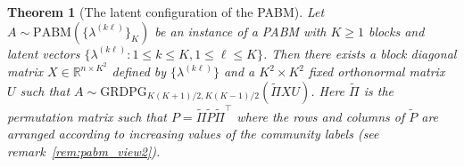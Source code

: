 \documentclass[
  11pt,
]{article}
\newtheorem{theorem}{Theorem}[section]
\theoremstyle{definition}
\theoremstyle{definition}
\theoremstyle{definition}
\theoremstyle{definition}
\theoremstyle{remark}
\begin{document}
\begin{theorem}[The latent configuration of the PABM]
\label{thm:pabm-grdpg}
Let $A \sim \mathrm{PABM}(\{\lambda^{(k \ell)}\}_K)$ be an instance of a
PABM with $K \geq 1$ blocks and latent vectors $\{\lambda^{(k \ell)}
\colon 1 \leq k \leq K, 1 \leq \ell \leq K\}$. 
Then there exists a block diagonal matrix
$X \in \mathbb{R}^{n \times K^2}$ defined by $\{\lambda^{(k \ell)}\}$ and a 
$K^2 \times K^2$ {\em fixed} orthonormal matrix $U$ such 
that $A \sim \mathrm{GRDPG}_{K (K+1) / 2, K (K-1) /
  2}(\tilde{\Pi}XU)$. Here $\tilde{\Pi}$ is the permutation matrix
such that $P = \tilde{\Pi} \tilde{P} \tilde{\Pi}^{\top}$ where the
rows and columns of $\tilde{P}$ are arranged according to increasing values of the
community labels (see remark~\ref{rem:pabm_view2}). 
\end{theorem}
\end{document}
